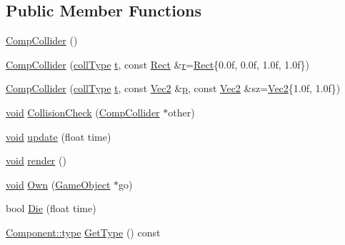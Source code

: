 \subsection*{Public Member Functions}
\begin{DoxyCompactItemize}
\item 
\hyperlink{class_comp_collider_a706ce7c898fcc058e326d924a9615e68}{Comp\-Collider} ()
\item 
\hyperlink{class_comp_collider_a59bb2f58d47c489ddd7213dc4c446bf0}{Comp\-Collider} (\hyperlink{class_comp_collider_a9eea092846b889fb5652416832727acd}{coll\-Type} \hyperlink{_s_d_l__opengl_8h_a7d65d00ca3b0630d9b5c52df855b19f5}{t}, const \hyperlink{class_rect}{Rect} \&\hyperlink{_s_d_l__opengl_8h_a42ce7cdc612e53abee15043f80220d97}{r}=\hyperlink{class_rect}{Rect}\{0.\-0f, 0.\-0f, 1.\-0f, 1.\-0f\})
\item 
\hyperlink{class_comp_collider_a1e2e16a7f596eac2110e02e61e62538f}{Comp\-Collider} (\hyperlink{class_comp_collider_a9eea092846b889fb5652416832727acd}{coll\-Type} \hyperlink{_s_d_l__opengl_8h_a7d65d00ca3b0630d9b5c52df855b19f5}{t}, const \hyperlink{class_vec2}{Vec2} \&\hyperlink{_s_d_l__opengl__glext_8h_aa5367c14d90f462230c2611b81b41d23}{p}, const \hyperlink{class_vec2}{Vec2} \&sz=\hyperlink{class_vec2}{Vec2}\{1.\-0f, 1.\-0f\})
\item 
\hyperlink{_s_d_l__opengles2__gl2ext_8h_ae5d8fa23ad07c48bb609509eae494c95}{void} \hyperlink{class_comp_collider_af0542c5b6e3cf98f5c3ec6fd97366c4b}{Collision\-Check} (\hyperlink{class_comp_collider}{Comp\-Collider} $\ast$other)
\item 
\hyperlink{_s_d_l__opengles2__gl2ext_8h_ae5d8fa23ad07c48bb609509eae494c95}{void} \hyperlink{class_comp_collider_ae2883ed5f225e3f496f77bcf5c6f9286}{update} (float time)
\item 
\hyperlink{_s_d_l__opengles2__gl2ext_8h_ae5d8fa23ad07c48bb609509eae494c95}{void} \hyperlink{class_comp_collider_a0797d855ac72f90c7385764785bd5862}{render} ()
\item 
\hyperlink{_s_d_l__opengles2__gl2ext_8h_ae5d8fa23ad07c48bb609509eae494c95}{void} \hyperlink{class_comp_collider_a0e23be031b8aef7f2d21d05bc254bbb5}{Own} (\hyperlink{class_game_object}{Game\-Object} $\ast$go)
\item 
bool \hyperlink{class_comp_collider_a9957bf13784983bcf1c985208acfc110}{Die} (float time)
\item 
\hyperlink{class_component_ad6d161b6acf7b843b55bb9feac7af71a}{Component\-::type} \hyperlink{class_comp_collider_a90ff44d718410925072cfcb3d934f196}{Get\-Type} () const 
\end{DoxyCompactItemize}
